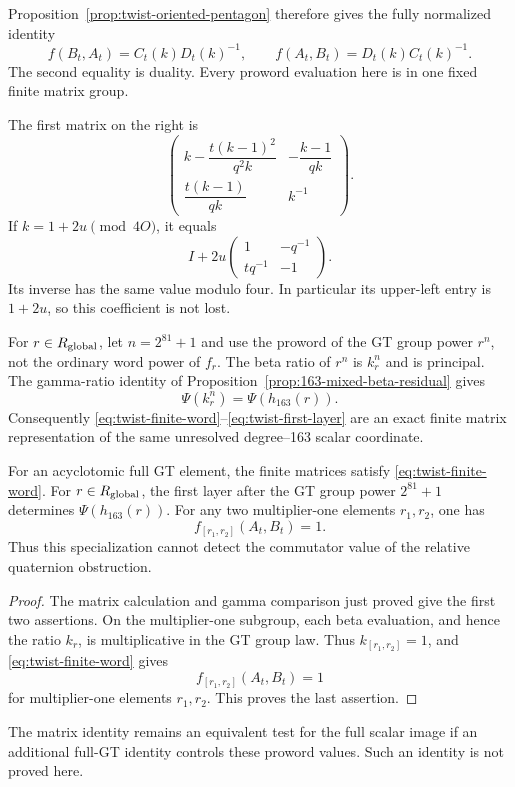 Proposition~\ref{prop:twist-oriented-pentagon} therefore gives the fully normalized identity
\begin{equation}
 f(B_t,A_t)=C_t(k)D_t(k)^{-1},\qquad
 f(A_t,B_t)=D_t(k)C_t(k)^{-1}.                        \label{eq:twist-finite-word}
\end{equation}
The second equality is duality. Every proword evaluation here is
in one fixed finite matrix group.

The first matrix on the right is
\[
 \begin{pmatrix}
 k-\dfrac{t(k-1)^2}{q^2k}&-\dfrac{k-1}{qk}\\[4pt]
 \dfrac{t(k-1)}{qk}&k^{-1}
 \end{pmatrix}.
\]
If \(k=1+2u\pmod{4O}\), it equals
\begin{equation}
 I+2u\begin{pmatrix}1&-q^{-1}\\tq^{-1}&-1\end{pmatrix}.
                                                               \label{eq:twist-first-layer}
\end{equation}
Its inverse has the same value modulo four. In particular its
upper-left entry is \(1+2u\), so this coefficient is not lost.

For \(r\in R_{\rm global}\), let \(n=2^{81}+1\) and use
the proword of the GT group power \(r^n\), not the ordinary word
power of \(f_r\). The beta ratio of \(r^n\) is \(k_r^n\)
and is principal. The gamma-ratio identity of Proposition~\ref{prop:163-mixed-beta-residual} gives
\[
 \Psi(k_r^n)=\Psi(h_{163}(r)).
\]
Consequently \eqref{eq:twist-finite-word}--\eqref{eq:twist-first-layer}
are an exact finite matrix representation of the same unresolved
degree--163 scalar coordinate.

\begin{corollary}\label{cor:twist-finite-scalar-and-commutator}
For an acyclotomic full GT element, the finite matrices satisfy
\eqref{eq:twist-finite-word}. For \(r\in R_{\rm global}\),
the first layer after the GT group power \(2^{81}+1\) determines
\(\Psi(h_{163}(r))\). For any two multiplier-one elements
\(r_1,r_2\), one has
\[
 f_{[r_1,r_2]}(A_t,B_t)=1.
\]
Thus this specialization cannot detect the commutator value of the
relative quaternion obstruction.
\end{corollary}
\begin{proof}
The matrix calculation and gamma comparison just proved give the
first two assertions. On the multiplier-one subgroup, each beta evaluation, and hence the
ratio \(k_r\), is multiplicative in the GT group law. Thus
\(k_{[r_1,r_2]}=1\), and \eqref{eq:twist-finite-word} gives
\[
 f_{[r_1,r_2]}(A_t,B_t)=1
\]
for multiplier-one elements \(r_1,r_2\). This proves the last assertion.
\end{proof}

The matrix identity remains an equivalent test for the full scalar
image if an additional full-GT identity controls these proword
values. Such an identity is not proved here.
